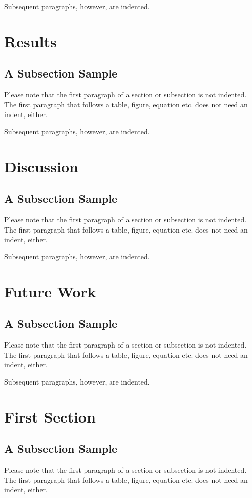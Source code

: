 \documentclass[runningheads]{llncs}
\begin{document}
Subsequent paragraphs, however, are indented.

\section{Results}
\subsection{A Subsection Sample}
Please note that the first paragraph of a section or subsection is
not indented. The first paragraph that follows a table, figure,
equation etc. does not need an indent, either.

Subsequent paragraphs, however, are indented.

\section{Discussion}
\subsection{A Subsection Sample}
Please note that the first paragraph of a section or subsection is
not indented. The first paragraph that follows a table, figure,
equation etc. does not need an indent, either.

Subsequent paragraphs, however, are indented.

\section{Future Work}
\subsection{A Subsection Sample}
Please note that the first paragraph of a section or subsection is
not indented. The first paragraph that follows a table, figure,
equation etc. does not need an indent, either.

Subsequent paragraphs, however, are indented.

\section{First Section}
\subsection{A Subsection Sample}
Please note that the first paragraph of a section or subsection is
not indented. The first paragraph that follows a table, figure,
equation etc. does not need an indent, either.
\end{document}
